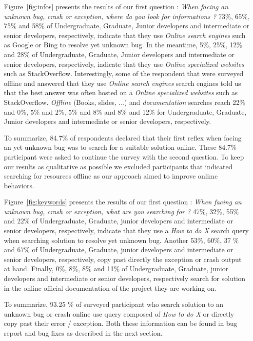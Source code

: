 \documentclass[conference]{IEEEtran}
\begin{document}
Figure~\ref{fig:infos} presents the results of our first question : \textit{When facing an unknown bug, crash or exception, where do you look for informations ?}
73\%, 65\%, 75\% and 58\% of Undergraduate, Graduate, Junior developers and intermediate or senior developers, respectively, indicate that they use \textit{Online search engines} such as Google or Bing to resolve yet unknown bug.
In the meantime, 5\%, 25\%, 12\% and 28\% of Undergraduate, Graduate, Junior developers and intermediate or senior developers, respectively, indicate that they use \textit{Online specialized websites} such as StackOverflow.
Interestingly, some of the respondent that were surveyed offline and answered that they use \textit{Online search engines} search engines told us that the best answer was often hosted on a \textit{Online specialized websites} such as StackOverflow. \textit{Offline} (Books, slides, ...) and \textit{documentation} searches reach 22\% and 0\%, 5\% and 2\%, 5\% and 8\% and 8\% and 12\% for  Undergraduate, Graduate, Junior developers and intermediate or senior developers, respectively.



To summarize, 84.7\% of respondents declared that their first reflex when facing an yet unknown bug was to search for a suitable solution online. These 84.7\% participant were asked to continue the survey with the second question.
To keep our results as qualitative as possible we excluded participants that indicated searching for resources offline as our approach aimed to improve onlime behaviors.

Figure~\ref{fig:keywords} presents the results of our first question : \textit{When facing an unknown bug, crash or exception, what are you searching for ?} 47\%, 32\%, 55\% and 22\% of Undergraduate, Graduate, junior developers and intermediate or senior developers, respectively, indicate that they use a \textit{How to do X} search query when searching solution to resolve yet unknown bug. Another 53\%, 60\%, 37 \% and 67\% of Undergraduate, Graduate, junior developers and intermediate or senior developers, respectively, copy past directly the exception or crash output at hand. Finally, 0\%, 8\%, 8\% and 11\% of Undergraduate, Graduate, junior developers and intermediate or senior developers, respectively search for solution in the online official documentation of the project they are working on.



To summarize, 93.25 \% of surveyed participant who search solution to an unknown bug or crash online use query composed of \textit{How to do X} or directly copy past their error / exception. Both these information can be found in bug report and bug fixes as described in the next section.
\end{document}
